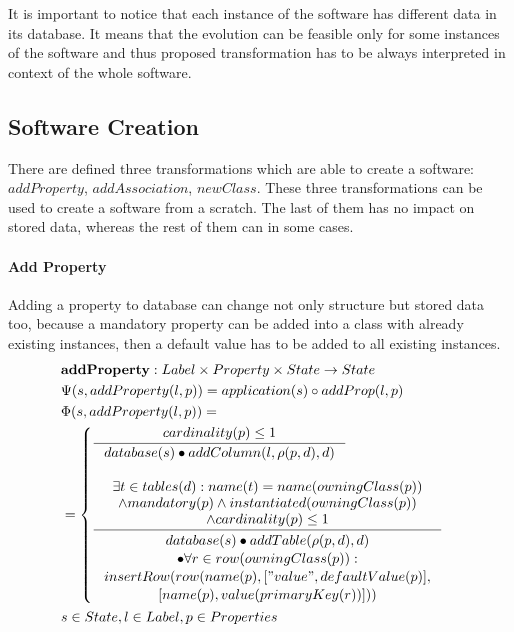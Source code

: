 \documentclass[11pt]{article}
\begin{document}
It is important to notice that each instance of the software has different data in its database. It means that the evolution can be feasible only for some instances of the software and thus proposed transformation has to be always interpreted in context of the whole software.


\subsection{Software Creation}
There are defined three transformations which are able to create a software: $addProperty$, $addAssociation$,  $newClass$. These three transformations can be used to create a software from a scratch. The last of them has no impact on stored data, whereas the rest of them can in some cases.
\paragraph{Add Property} Adding a property to database can change not only structure but stored data too, because a mandatory property can be added into a class with already existing instances, then a default value has to be added to all existing instances.
\begin{align*}
&	\mathbf{addProperty} : Label \times Property \times State \rightarrow State \\
&	\Psi(s, addProperty(l, p)) = application(s) \circ addProp(l,p) \\
&	\Phi(s, addProperty(l, p)) = \\
& = \begin{cases}
    		\inference{cardinality(p) \leq 1}{database(s) \bullet addColumn(l, \rho(p,d), d)} \\ \\
	    \inference{ \exists t \in tables(d) : name(t) = name(owningClass(p)) \\ \wedge mandatory(p) \wedge instantiated(owningClass(p)) \\ \wedge cardinality(p) \leq 1}{\begin{gathered}
   database(s) \bullet addTable(\rho(p,d), d) \\ \bullet \forall r \in row(owningClass(p)) :\\ insertRow(row(name(p), ["value", defaultValue(p)], \\ [name(p), value(primaryKey(r))])) 
    \end{gathered} } 
   \end{cases}\\
&	s \in State, l \in Label, p \in Properties
\end{align*}
\end{document}

